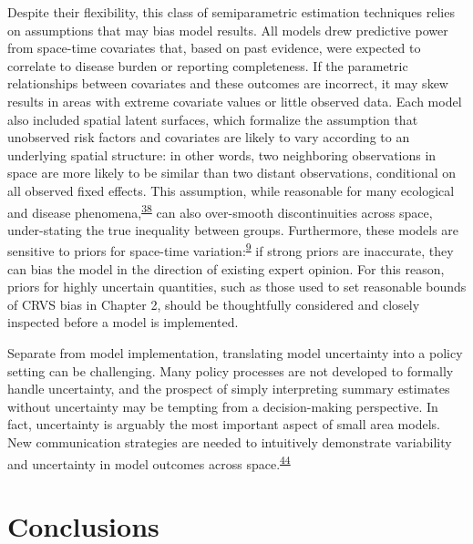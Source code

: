 \documentclass[
]{article}
\begin{document}
Despite their flexibility, this class of semiparametric estimation techniques relies on assumptions that may bias model results. All models drew predictive power from space-time covariates that, based on past evidence, were expected to correlate to disease burden or reporting completeness. If the parametric relationships between covariates and these outcomes are incorrect, it may skew results in areas with extreme covariate values or little observed data. Each model also included spatial latent surfaces, which formalize the assumption that unobserved risk factors and covariates are likely to vary according to an underlying spatial structure: in other words, two neighboring observations in space are more likely to be similar than two distant observations, conditional on all observed fixed effects. This assumption, while reasonable for many ecological and disease phenomena,\textsuperscript{\protect\hyperlink{ref-Diggle2016}{38}} can also over-smooth discontinuities across space, under-stating the true inequality between groups. Furthermore, these models are sensitive to priors for space-time variation:\textsuperscript{\protect\hyperlink{ref-Wakefield2019}{9}} if strong priors are inaccurate, they can bias the model in the direction of existing expert opinion. For this reason, priors for highly uncertain quantities, such as those used to set reasonable bounds of CRVS bias in Chapter 2, should be thoughtfully considered and closely inspected before a model is implemented.

Separate from model implementation, translating model uncertainty into a policy setting can be challenging. Many policy processes are not developed to formally handle uncertainty, and the prospect of simply interpreting summary estimates without uncertainty may be tempting from a decision-making perspective. In fact, uncertainty is arguably the most important aspect of small area models. New communication strategies are needed to intuitively demonstrate variability and uncertainty in model outcomes across space.\textsuperscript{\protect\hyperlink{ref-Patil2011}{44}}

\hypertarget{conclusions}{%
\section{Conclusions}\label{conclusions}}
\end{document}
